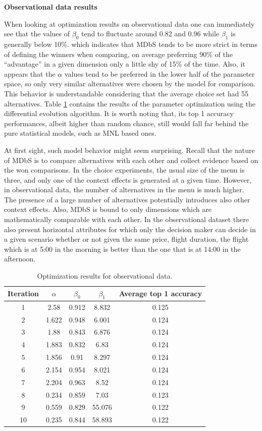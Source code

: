 \documentclass[a4paper,12pt]{article}
\begin{document}
\textbf{Observational data results}


When looking at optimization results on observational data one can immediately see that the values of $\beta_0$ tend to fluctuate around 0.82 and 0.96 while $\beta_1$ is generally below 10\%.  which indicates that MDbS tends to be more strict in terms of defining the winners when comparing, on average preferring 90\% of the ``advantage'' in a given dimension only a little shy of 15\% of the time. Also, it appears that the $\alpha$ values tend to be preferred in the lower half of the parameter space, so only very similar alternatives were chosen by the model for comparison. This behavior is understandable considering that the average choice set had 55 alternatives. Table \ref{tab:optimizationAmadeusResults} contains the results of the parameter optimization using the differential evolution algorithm. It is worth noting that, its top 1 accuracy performances, albeit higher than random chance, still would fall far behind the pure statistical models, such as MNL based ones. 

At first sight, such model behavior might seem surprising. Recall that the nature of MDbS is to compare alternatives with each other and collect evidence based on the won comparisons. In the choice experiments, the usual size of the menu is three, and only one of the context effects is generated at a given time. However, in observational data, the number of alternatives in the menu is much higher. The presence of a large number of alternatives potentially introduces also other context effects. Also, MDbS is bound to only dimensions which are mathematically comparable with each other. In the observational dataset there also present horizontal attributes for which only the decision maker can decide in a given scenario whether or not given the same price, flight duration, the flight which is at 5:00 in the morning is better than the one that is at 14:00 in the afternoon.

\begin{table}
\centering
\begin{tabular}{ccccc}
\hline
Iteration & $\alpha$ & $\beta_0$ & $\beta_1$ & Average top 1 accuracy \\
\hline
1 & 2.58 & 0.912 & 8.832 & 0.125 \\
2 & 1.622 & 0.948 & 6.001 & 0.124 \\
3 & 1.88 & 0.843 & 6.876 & 0.124 \\
4 & 1.883 & 0.832 & 6.83 & 0.124 \\
5 & 1.856 & 0.91 & 8.297 & 0.124 \\
6 & 2.154 & 0.954 & 8.021 & 0.124 \\
7 & 2.204 & 0.963 & 8.52 & 0.124 \\
8 & 0.234 & 0.859 & 7.03 & 0.123 \\
9 & 0.559 & 0.829 & 55.076 & 0.122 \\
10 & 0.235 & 0.844 & 58.893 & 0.122 \\
\hline
\end{tabular}
\caption{Optimization results for observational data.}
\label{tab:optimizationAmadeusResults}
\end{table}
\end{document}
